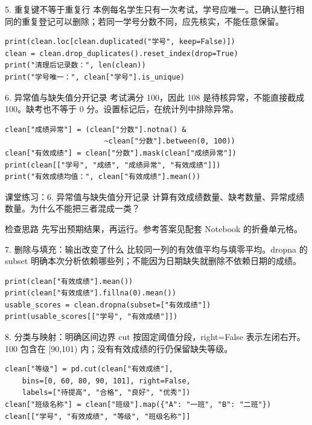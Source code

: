 \begin{frame}[fragile]{5. 重复键不等于重复行}
\small 本例每名学生只有一次考试，学号应唯一。已确认整行相同的重复登记可以删除；若同一学号分数不同，应先核实，不能任意保留。
\medskip
\begin{lstlisting}
print(clean.loc[clean.duplicated("学号", keep=False)])
clean = clean.drop_duplicates().reset_index(drop=True)
print("清理后记录数：", len(clean))
print("学号唯一：", clean["学号"].is_unique)
\end{lstlisting}
\end{frame}

\begin{frame}[fragile]{6. 异常值与缺失值分开记录}
\small 考试满分 100，因此 108 是待核异常，不能直接截成 100。缺考也不等于 0 分。设置标记后，在统计列中排除异常。
\medskip
\begin{lstlisting}
clean["成绩异常"] = (clean["分数"].notna() &
                       ~clean["分数"].between(0, 100))
clean["有效成绩"] = clean["分数"].mask(clean["成绩异常"])
print(clean[["学号", "成绩", "成绩异常", "有效成绩"]])
print("有效成绩均值：", clean["有效成绩"].mean())
\end{lstlisting}
\end{frame}
\begin{frame}[fragile]{课堂练习：6. 异常值与缺失值分开记录}
计算有效成绩数量、缺考数量、异常成绩数量。为什么不能把三者混成一类？
\medskip
\begin{block}{检查思路}
先写出预期结果，再运行。参考答案见配套 Notebook 的折叠单元格。
\end{block}
\end{frame}

\begin{frame}[fragile]{7. 删除与填充：输出改变了什么}
\small 比较同一列的有效值平均与填零平均。dropna 的 subset 明确本次分析依赖哪些列；不能因为日期缺失就删除不依赖日期的成绩。
\medskip
\begin{lstlisting}
print(clean["有效成绩"].mean())
print(clean["有效成绩"].fillna(0).mean())
usable_scores = clean.dropna(subset=["有效成绩"])
print(usable_scores[["学号", "有效成绩"]])
\end{lstlisting}
\end{frame}

\begin{frame}[fragile]{8. 分类与映射：明确区间边界}
\small cut 按固定阈值分段，right=False 表示左闭右开。100 包含在 [90,101) 内；没有有效成绩的行仍保留缺失等级。
\medskip
\begin{lstlisting}
clean["等级"] = pd.cut(clean["有效成绩"],
    bins=[0, 60, 80, 90, 101], right=False,
    labels=["待提高", "合格", "良好", "优秀"])
clean["班级名称"] = clean["班级"].map({"A": "一班", "B": "二班"})
clean[["学号", "有效成绩", "等级", "班级名称"]]
\end{lstlisting}
\end{frame}

